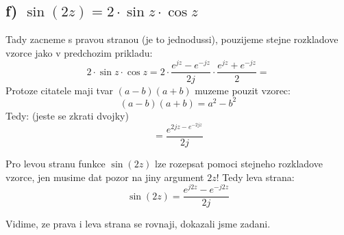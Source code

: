 \subsection{f) $\operatorname{sin}(2z) = 2\cdot \operatorname{sin}z \cdot \operatorname{cos}z$}
Tady zacneme s pravou stranou (je to jednodussi), pouzijeme stejne rozkladove vzorce jako v predchozim prikladu:
$$2\cdot \operatorname{sin}z \cdot \operatorname{cos}z = 2\cdot \frac{e^{jz}-e^{-jz}}{2j} \cdot \frac{e^{jz}+e^{-jz}}{2} = $$
Protoze citatele maji tvar $(a-b)(a+b)$ muzeme pouzit vzorec:
$$(a-b)(a+b) = a^2 - b^2$$
Tedy: (jeste se zkrati dvojky)
$$ = \frac{e^{2jz - e^{-2jz}}}{2j} $$

Pro levou stranu funkce $\operatorname{sin}(2z)$ lze rozepsat pomoci stejneho rozkladove vzorce, jen musime dat pozor na jiny argument $2z$! Tedy leva strana:
$$\operatorname{sin}(2z) = \frac{e^{j2z}-e^{-j2z}}{2j}$$

Vidime, ze prava i leva strana se rovnaji, dokazali jsme zadani.



